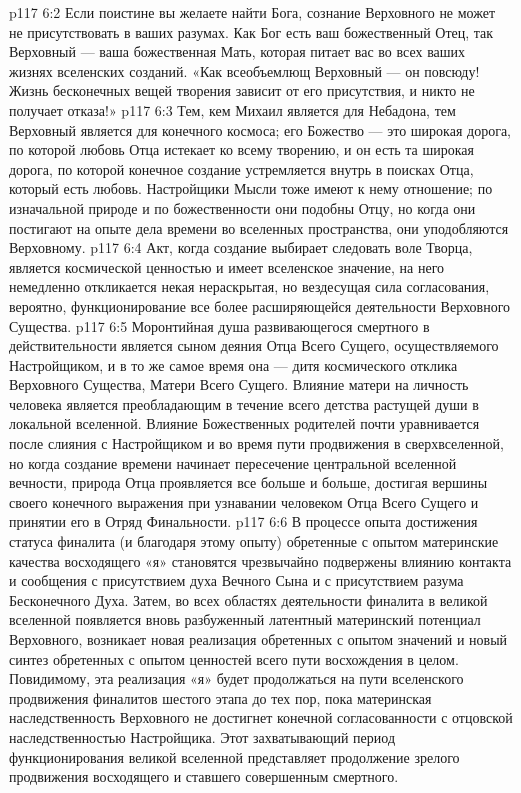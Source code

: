 \vs p117 6:2 Если поистине вы желаете найти Бога, сознание Верховного не может не присутствовать в ваших разумах. Как Бог есть ваш божественный Отец, так Верховный --- ваша божественная Мать, которая питает вас во всех ваших жизнях вселенских созданий. «Как всеобъемлющ Верховный --- он повсюду! Жизнь бесконечных вещей творения зависит от его присутствия, и никто не получает отказа!»
\vs p117 6:3 Тем, кем Михаил является для Небадона, тем Верховный является для конечного космоса; его Божество --- это широкая дорога, по которой любовь Отца истекает ко всему творению, и он есть та широкая дорога, по которой конечное создание устремляется внутрь в поисках Отца, который есть любовь. Настройщики Мысли тоже имеют к нему отношение; по изначальной природе и по божественности они подобны Отцу, но когда они постигают на опыте дела времени во вселенных пространства, они уподобляются Верховному.
\vs p117 6:4 \pc Акт, когда создание выбирает следовать воле Творца, является космической ценностью и имеет вселенское значение, на него немедленно откликается некая нераскрытая, но вездесущая сила согласования, вероятно, функционирование все более расширяющейся деятельности Верховного Существа.
\vs p117 6:5 Моронтийная душа развивающегося смертного в действительности является сыном деяния Отца Всего Сущего, осуществляемого Настройщиком, и в то же самое время она --- дитя космического отклика Верховного Существа, Матери Всего Сущего. Влияние матери на личность человека является преобладающим в течение всего детства растущей души в локальной вселенной. Влияние Божественных родителей почти уравнивается после слияния с Настройщиком и во время пути продвижения в сверхвселенной, но когда создание времени начинает пересечение центральной вселенной вечности, природа Отца проявляется все больше и больше, достигая вершины своего конечного выражения при узнавании человеком Отца Всего Сущего и принятии его в Отряд Финальности.
\vs p117 6:6 В процессе опыта достижения статуса финалита (и благодаря этому опыту) обретенные с опытом материнские качества восходящего «я» становятся чрезвычайно подвержены влиянию контакта и сообщения с присутствием духа Вечного Сына и с присутствием разума Бесконечного Духа. Затем, во всех областях деятельности финалита в великой вселенной появляется вновь разбуженный латентный материнский потенциал Верховного, возникает новая реализация обретенных с опытом значений и новый синтез обретенных с опытом ценностей всего пути восхождения в целом. Повидимому, эта реализация «я» будет продолжаться на пути вселенского продвижения финалитов шестого этапа до тех пор, пока материнская наследственность Верховного не достигнет конечной согласованности с отцовской наследственностью Настройщика. Этот захватывающий период функционирования великой вселенной представляет продолжение зрелого продвижения восходящего и ставшего совершенным смертного.
